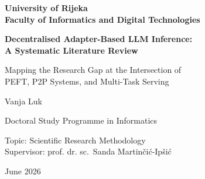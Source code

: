 \documentclass[a4paper,12pt]{article}
\begin{document}
\begin{titlepage}
  \centering
  \vspace*{2cm}
  {\Large\bfseries University of Rijeka\\
   Faculty of Informatics and Digital Technologies\par}
  \vspace{2cm}

  

  {\LARGE\bfseries Decentralised Adapter-Based LLM Inference: \\
  A Systematic Literature Review\par}
  \vspace{1.5cm}
  {\large Mapping the Research Gap at the Intersection of \\ PEFT, P2P Systems, and Multi-Task Serving\par}
  \vspace{2.5cm}
  {\large Vanja Luk\par}
  \vspace{0.3cm}
  {\normalsize Doctoral Study Programme in Informatics\par}
  \vspace{0.7cm}
  {\normalsize
    Topic: Scientific Research Methodology\\
    Supervisor: prof. dr. sc.\ Sanda Martinčić-Ipšić\par}
  \vspace{1cm}
  {\normalsize June 2026\par}
\end{titlepage}



\newpage
\tableofcontents
\newpage


\newpage

\newpage

\newpage

\newpage

\newpage

\newpage

\newpage

\newpage

\newpage


\newpage


\newpage
\begin{appendices}

\end{appendices}
\end{document}
